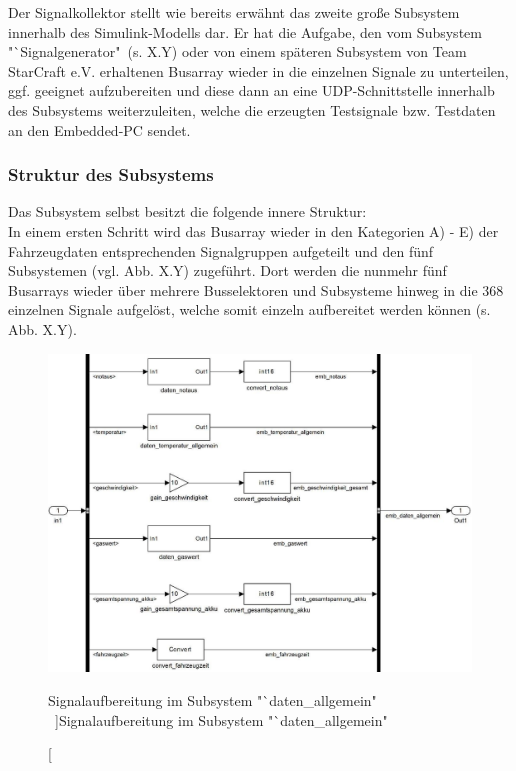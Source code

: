 \documentclass[fontsize = 12pt, paper = a4]{scrreprt}
\begin{document}
Der Signalkollektor stellt wie bereits erwähnt das zweite große Subsystem innerhalb des Simulink-Modells dar. Er hat die Aufgabe, den vom Subsystem "`Signalgenerator"\ (s. X.Y) oder von einem späteren Subsystem von Team StarCraft e.V. erhaltenen Busarray wieder in die einzelnen Signale zu unterteilen, ggf. geeignet aufzubereiten und diese dann an eine UDP-Schnittstelle innerhalb des Subsystems weiterzuleiten, welche die erzeugten Testsignale bzw. Testdaten an den Embedded-PC sendet.  

\subsubsection{Struktur des Subsystems}

Das Subsystem selbst besitzt die folgende innere Struktur: \\
In einem ersten Schritt wird das Busarray wieder in den Kategorien A) - E) der Fahrzeugdaten entsprechenden Signalgruppen aufgeteilt und den fünf Subsystemen (vgl. Abb. X.Y) zugeführt. Dort werden die nunmehr fünf Busarrays wieder über mehrere Busselektoren und Subsysteme hinweg in die 368 einzelnen Signale aufgelöst, welche somit einzeln aufbereitet werden können (s. Abb. X.Y). \\

\begin{figure}[h]
\centering
\includegraphics[scale = 0.70]{collallgemein}
\caption[Signalaufbereitung im Subsystem "`daten\_allgemein" \ ]{Signalaufbereitung im Subsystem "`daten\_allgemein" \ }
\end{figure} 
\end{document}
